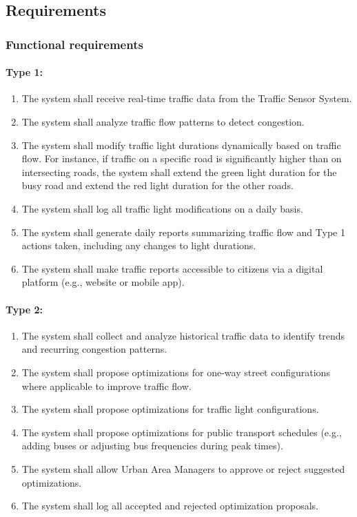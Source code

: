 \documentclass[11.5pt]{article}
\begin{document}
    \subsection{Requirements}
    \subsubsection{Functional requirements}
    \paragraph{Type 1:}
    \begin{enumerate}
        \item The system shall receive real-time traffic data from the Traffic Sensor System.
        \item The system shall analyze traffic flow patterns to detect congestion.
        \item The system shall modify traffic light durations dynamically based on traffic flow. For instance, if traffic on a specific road is significantly higher than on intersecting roads, the system shall extend the green light duration for the busy road and extend the red light duration for the other roads.
        \item The system shall log all traffic light modifications on a daily basis.
        \item The system shall generate daily reports summarizing traffic flow and
            Type 1 actions taken, including any changes to light durations.
        \item The system shall make traffic reports accessible to citizens via a
            digital platform (e.g., website or mobile app).
    \end{enumerate}

    \paragraph{Type 2:}
    \begin{enumerate}
        \item The system shall collect and analyze historical traffic data to identify
            trends and recurring congestion patterns.

        \item The system shall propose optimizations for one-way street configurations
            where applicable to improve traffic flow.

        \item The system shall propose optimizations for traffic light configurations.

        \item The system shall propose optimizations for public transport schedules
            (e.g., adding buses or adjusting bus frequencies during peak times).

        \item The system shall allow Urban Area Managers to approve or reject suggested
            optimizations.

        \item The system shall log all accepted and rejected optimization proposals.
    \end{enumerate}
\end{document}
